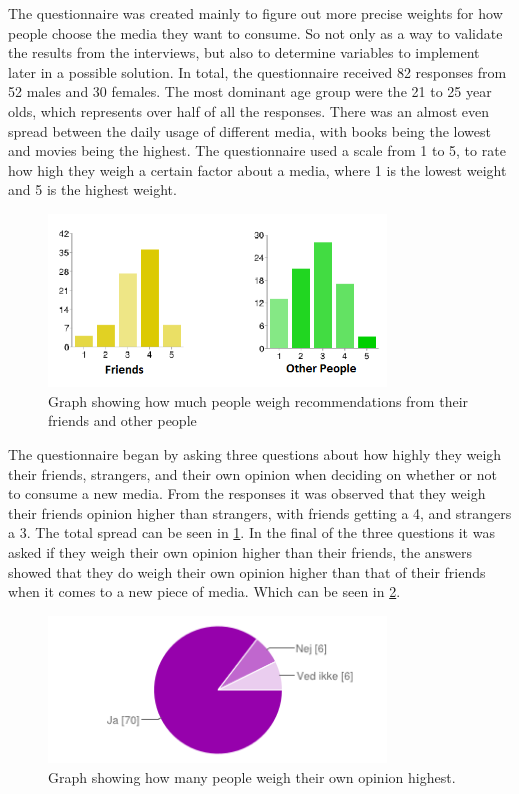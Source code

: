 The questionnaire was created mainly to figure out more precise weights for how people choose the media they want to consume. So not only as a way to validate the results from the interviews, but also to determine variables to implement later in a possible solution.
In total, the questionnaire received 82 responses from 52 males and 30 females. The most dominant age group were the 21 to 25 year olds, which represents over half of all the responses. There was an almost even spread between the daily usage of different media, with books being the lowest and movies being the highest.
The questionnaire used a scale from 1 to 5, to rate how high they weigh a certain factor about a media, where 1 is the lowest weight and 5 is the highest weight.

\begin{figure}[htb]
\centering
\includegraphics[width=0.8\textwidth]{Images/people.png}
\caption{Graph showing how much people weigh recommendations from their friends and other people}
\label{People}
\end{figure}

The questionnaire began by asking three questions about how highly they weigh their friends, strangers, and their own opinion when deciding on whether or not to consume a new media. From the responses it was observed that they weigh their friends opinion higher than strangers, with friends getting a 4, and strangers a 3. The total spread can be seen in \ref{People}. In the final of the three questions it was asked if they weigh their own opinion higher than their friends,  the answers showed that they do weigh their own opinion higher than that of their friends when it comes to a new piece of media. Which can be seen in \ref{Own}.



\begin{figure}[htb]
\centering
\includegraphics[width=0.8\textwidth]{Images/own.png}
\caption{Graph showing how many people weigh their own opinion highest.}
\label{Own}
\end{figure}

